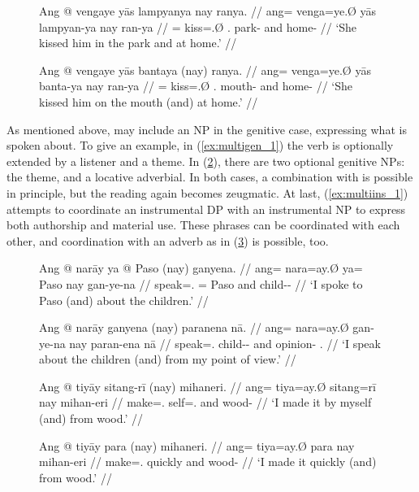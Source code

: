 \begin{figure}
\pex\label{ex:multiplace_5}%
\a\label{ex:multiplace_5_1}%
\begingl
	\gla Ang @ vengaye yās lampyanya nay ranya. //
	\glb ang= venga=ye.Ø yās lampyan-ya nay ran-ya //
	\glc \AgtT{}= kiss=\TsgF{}.Ø \TsgM{}.\Parg{} park-\Loc{} and home-\Loc{} //
	\glft `She kissed him in the park and at home.' //
\endgl

\a\label{ex:multiplace_5_2}%
\begingl
	\gla Ang @ vengaye yās bantaya \textup{(\excl{}}nay\textup{)} ranya. //
	\glb ang= venga=ye.Ø yās banta-ya nay ran-ya //
	\glc \AgtT{}= kiss=\TsgF{}.Ø \TsgM{}.\Parg{} mouth-\Loc{} and 
		home-\Loc{}	//
	\glft `She kissed him on the mouth (\excl{}and) at home.' //
\endgl
\xe
\end{figure}

As mentioned above,  may include an NP in the genitive case,
expressing what is spoken about. To give an example, in (\ref{ex:multigen_1})
the verb is optionally extended by a listener and a theme. In
(\ref{ex:multigen_2}), there are two optional genitive NPs: the theme, and a
locative adverbial. In both cases, a combination with  is
possible in principle, but the reading again becomes zeugmatic. At last,
(\ref{ex:multiins_1}) attempts to coordinate an instrumental DP with an
instrumental NP to express both authorship and material use. These phrases can
be coordinated with each other, and coordination with an adverb as in
(\ref{ex:multiins_2}) is possible, too.

\begin{figure}
\pex\label{ex:multigen}
\a\label{ex:multigen_1}%
\begingl
	\gla Ang @ narāy ya @ Paso \textup{(\excl{}}nay\textup{)} ganyena. //
	\glb ang= nara=ay.Ø ya= Paso nay gan-ye-na //
	\glc \AgtT{} speak=\Fsg{}.\Top{} \Loc{}= Paso and child-\Pl{}-\Gen{} //
	\glft `I spoke to Paso (\excl{}and) about the children.' //
\endgl

\a\label{ex:multigen_2}%
\begingl
	\gla Ang @ narāy ganyena \textup{(\excl{}}nay\textup{)} paranena nā. //
	\glb ang= nara=ay.Ø gan-ye-na nay paran-ena nā //
	\glc \AgtT{} speak=\Fsg{}.\Top{} child-\Pl{}-\Gen{} and opinion-\Gen{}
		\Fsg{}.\Gen{} //
	\glft `I speak about the children (\excl{}and) from my point of view.' //
\endgl
\xe
\end{figure}

\begin{figure}
\pex\label{ex:multiins}%
\a\label{ex:multiins_1}%
\begingl
	\gla Ang @ tiyāy sitang-rī \textup{(}nay\textup{)} mihaneri. //
	\glb ang= tiya=ay.Ø sitang=rī nay mihan-eri //
	\glc \AgtT{} make=\Fsg{}.\Top{} self=\Fsg{}.\Ins{} and wood-\Ins{} //
	\glft `I made it by myself (and) from wood.' //
\endgl

\a\label{ex:multiins_2}%
\begingl
	\gla Ang @ tiyāy para \textup{(}nay\textup{)} mihaneri. //
	\glb ang= tiya=ay.Ø para nay mihan-eri //
	\glc \AgtT{} make=\Fsg{}.\Top{} quickly and wood-\Ins{} //
	\glft `I made it quickly (and) from wood.' //
\endgl
\xe
\end{figure}


